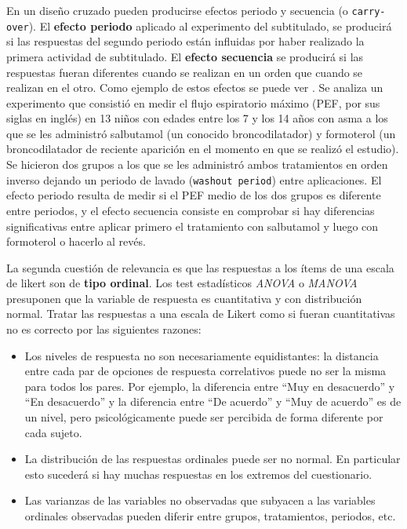 \documentclass[
  12pt,
  a4paper,
  extrafontsizes,
  onecolumn,
  openright,
  table]{memoir}
\begin{document}
En un diseño cruzado pueden producirse efectos periodo y secuencia (o
\texttt{carry-over}). El \textbf{efecto periodo} aplicado al experimento
del subtitulado, se producirá si las respuestas del segundo periodo
están influidas por haber realizado la primera actividad de subtitulado.
El \textbf{efecto secuencia} se producirá si las respuestas fueran
diferentes cuando se realizan en un orden que cuando se realizan en el
otro. Como ejemplo de estos efectos se puede ver
\textcite[pp.~35-53]{senn2022}. Se analiza un experimento que consistió
en medir el flujo espiratorio máximo (PEF, por sus siglas en inglés) en
13 niños con edades entre los 7 y los 14 años con asma a los que se les
administró salbutamol (un conocido broncodilatador) y formoterol (un
broncodilatador de reciente aparición en el momento en que se realizó el
estudio). Se hicieron dos grupos a los que se les administró ambos
tratamientos en orden inverso dejando un periodo de lavado
(\texttt{washout\ period}) entre aplicaciones. El \gls{efecto periodo}
resulta de medir si el PEF medio de los dos grupos es diferente entre
periodos, y el \gls{efecto secuencia} consiste en comprobar si hay
diferencias significativas entre aplicar primero el tratamiento con
salbutamol y luego con formoterol o hacerlo al revés.

La segunda cuestión de relevancia es que las respuestas a los ítems de
una \gls{escala de likert} son de \textbf{tipo ordinal}. Los test
estadísticos \emph{\gls{ANOVA}} o \emph{\gls{MANOVA}} presuponen que la
variable de respuesta es cuantitativa y con distribución normal. Tratar
las respuestas a una escala de Likert como si fueran cuantitativas no es
correcto por las siguientes razones:

\begin{itemize}
\item
  Los niveles de respuesta no son necesariamente equidistantes: la
  distancia entre cada par de opciones de respuesta correlativos puede
  no ser la misma para todos los pares. Por ejemplo, la diferencia entre
  \enquote{Muy en desacuerdo} y \enquote{En desacuerdo} y la diferencia
  entre \enquote{De acuerdo} y \enquote{Muy de acuerdo} es de un nivel,
  pero psicológicamente puede ser percibida de forma diferente por cada
  sujeto.
\item
  La distribución de las respuestas ordinales puede ser no normal. En
  particular esto sucederá si hay muchas respuestas en los extremos del
  cuestionario.
\item
  Las varianzas de las variables no observadas que subyacen a las
  variables ordinales observadas pueden diferir entre grupos,
  tratamientos, periodos, etc.
\end{itemize}
\end{document}
